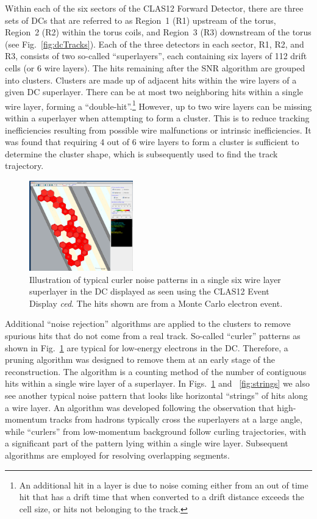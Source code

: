 Within each of the six sectors of the CLAS12 Forward Detector, there are three sets of DCs that are referred to
as Region~1 (R1) upstream of the torus, Region~2 (R2) within the torus coils, and Region~3 (R3) downstream
of the torus (see Fig.~\ref{fig:dcTracks}). Each of the three detectors in each sector, R1, R2, and R3, consists of
two so-called ``superlayers'',  each containing six layers of 112 drift cells (or 6 wire layers). The hits remaining
after the SNR algorithm are grouped into clusters. Clusters are made up of adjacent hits within the wire layers of
a given DC superlayer. There can be at most two neighboring hits within a single wire layer, forming a
``double-hit''.\footnote{An additional hit in a layer is due to noise coming either from an out of time hit that has a drift time that when converted to a drift
  distance exceeds the cell size, or hits not belonging to the track.}  However, up to two wire layers can be missing within a superlayer when attempting
to form a cluster.  This is to reduce tracking inefficiencies resulting from possible wire malfunctions or intrinsic
inefficiencies. It was found that requiring 4 out of 6 wire layers to form a cluster is sufficient to determine the
cluster shape, which is subsequently used to find the track trajectory.

\begin{figure}
\centering
\includegraphics[width=0.4\textwidth]{pics/elooper.png}
\caption{Illustration of typical curler noise patterns in a single six wire layer superlayer in the DC displayed as seen using
  the CLAS12 Event Display {\it ced}. The hits shown are from a Monte Carlo electron event.}
\label{fig:eloop}
\end{figure}

Additional ``noise rejection'' algorithms are applied to the clusters to remove spurious hits that do not come from
a real track. So-called ``curler'' patterns as shown in Fig.~\ref{fig:eloop} are typical for low-energy electrons in
the DC.  Therefore, a pruning algorithm was designed to remove them at an early stage of the reconstruction. The
algorithm is a counting method of the number of contiguous hits within a single wire layer of a superlayer.  In
Figs.~\ref{fig:eloop} and ~\ref{fig:strings} we also see another typical noise pattern that looks like horizontal
``strings'' of hits along a wire layer. An algorithm was developed following  the observation that high-momentum
tracks from hadrons typically cross the superlayers at a large angle, while ``curlers'' from low-momentum
background follow curling trajectories, with a significant part of the pattern lying within a single wire layer.
Subsequent algorithms  are employed for resolving overlapping segments.   

